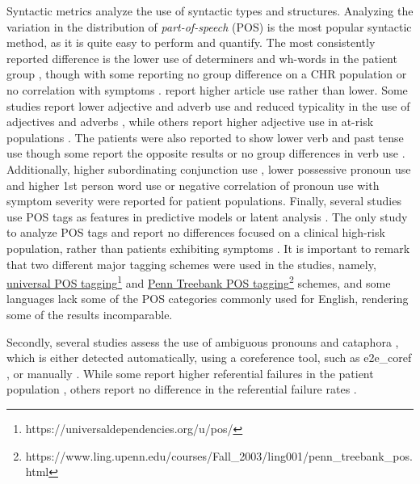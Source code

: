 Syntactic metrics analyze the use of syntactic types and structures. Analyzing the variation in the distribution of \textit{part-of-speech} (POS) is the most popular syntactic method, as it is quite easy to perform and quantify. The most consistently reported difference is the lower use of determiners and wh-words in the patient group \citep{bedi2015automated, corcoran2018prediction, sarzynska2021detecting, tang2021natural}, though with some reporting no group difference on a CHR population \citep{bilgrami2022construct} or no correlation with symptoms \citep{corcoran2018prediction, bilgrami2022construct}. \citet{mitchell2015quantifying} report higher article use rather than lower. Some studies report lower adjective and adverb use \citep{corcoran2018prediction, tang2021natural, ziv2022morphological} and reduced typicality in the use of adjectives and adverbs \citep{bar2019semantic}, while others report higher adjective use in at-risk populations \citep{argolo2023burnishing}. The patients were also reported to show lower verb and past tense use \citep{ziv2022morphological} though some report the opposite results \citep{mitchell2015quantifying} or no group differences in verb use \citep{tang2021natural, argolo2023burnishing}. Additionally, higher subordinating conjunction use \citep{silva2022syntactic}, lower possessive pronoun use \citep{corcoran2018prediction} and higher 1st person word use \citep{ziv2022morphological} or negative correlation of pronoun use with symptom severity \citep{jeong2023exploring} were reported for patient populations. Finally, several studies use POS tags as features in predictive models or latent analysis \citep{bedi2015automated, sarzynska2021detecting, tang2022clinical, tang2023latent}. The only study to analyze POS tags and report no differences focused on a clinical high-risk population, rather than patients exhibiting symptoms \citep{haas2020linking}. It is important to remark that two different major tagging schemes were used in the studies, namely, \href{https://universaldependencies.org/u/pos/}{universal POS tagging}\footnote{https://universaldependencies.org/u/pos/} and \href{https://www.ling.upenn.edu/courses/Fall_2003/ling001/penn_treebank_pos.html}{Penn Treebank POS tagging}\footnote{https://www.ling.upenn.edu/courses/Fall\_2003/ling001/penn\_treebank\_pos.html} schemes, and some languages lack some of the POS categories commonly used for English, rendering some of the results incomparable.

Secondly, several studies assess the use of ambiguous pronouns and cataphora \citep{iter2018automatic, morgan2021natural, nettekoven2023semantic}, which is either detected automatically, using a coreference tool, such as e2e\_coref \citep{lee2017end}, or manually \citep{just2020modeling}. While some report higher referential failures in the patient population \citep{iter2018automatic, just2020modeling}, others report no difference in the referential failure rates \citep{morgan2021natural}.

